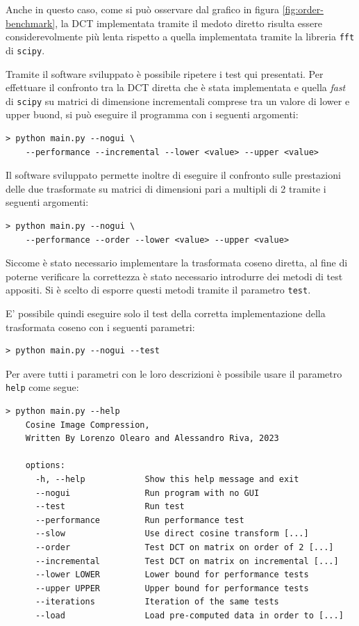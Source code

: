 \documentclass[a4paper, 12pt]{article}
\begin{document}
Anche in questo caso, come si può osservare dal grafico in figura
\ref{fig:order-benchmark}, la DCT implementata tramite il medoto diretto risulta
essere considerevolmente più lenta rispetto a quella implementata tramite la
libreria
\texttt{fft} di \texttt{scipy}.

Tramite il software sviluppato è possibile ripetere i test qui presentati. Per
effettuare il confronto tra la DCT diretta che è stata implementata e quella
\textit{fast} di \texttt{scipy} su matrici di dimensione incrementali comprese
tra un valore di lower e upper buond, si può eseguire il programma con i
seguenti argomenti:
\vspace{12pt}
\begin{lstlisting}[frame=single]
 > python main.py --nogui \
    --performance --incremental --lower <value> --upper <value>
\end{lstlisting}

Il software sviluppato permette inoltre di eseguire il confronto sulle
prestazioni delle due trasformate su matrici di dimensioni pari a multipli di 2
tramite i seguenti argomenti:
\vspace{12pt}
\begin{lstlisting}[frame=single]
 > python main.py --nogui \
    --performance --order --lower <value> --upper <value>
\end{lstlisting}

Siccome è stato necessario implementare la trasformata coseno diretta, al fine
di poterne verificare la correttezza è stato necessario introdurre dei metodi di
test appositi. Si è scelto di esporre questi metodi tramite il parametro
\texttt{test}.

E' possibile quindi eseguire solo il test della corretta implementazione della
trasformata coseno con i seguenti parametri:
\vspace{12pt}
\begin{lstlisting}[frame=single]
 > python main.py --nogui --test
\end{lstlisting}

Per avere tutti i parametri con le loro descrizioni è possibile usare il
parametro \texttt{help} come segue:
\vspace{12pt}
\begin{lstlisting}[frame=single]
 > python main.py --help
    Cosine Image Compression,
    Written By Lorenzo Olearo and Alessandro Riva, 2023

    options:
      -h, --help            Show this help message and exit
      --nogui               Run program with no GUI
      --test                Run test
      --performance         Run performance test
      --slow                Use direct cosine transform [...]
      --order               Test DCT on matrix on order of 2 [...]
      --incremental         Test DCT on matrix on incremental [...]
      --lower LOWER         Lower bound for performance tests
      --upper UPPER         Upper bound for performance tests
      --iterations          Iteration of the same tests
      --load                Load pre-computed data in order to [...]
\end{lstlisting}
\end{document}

